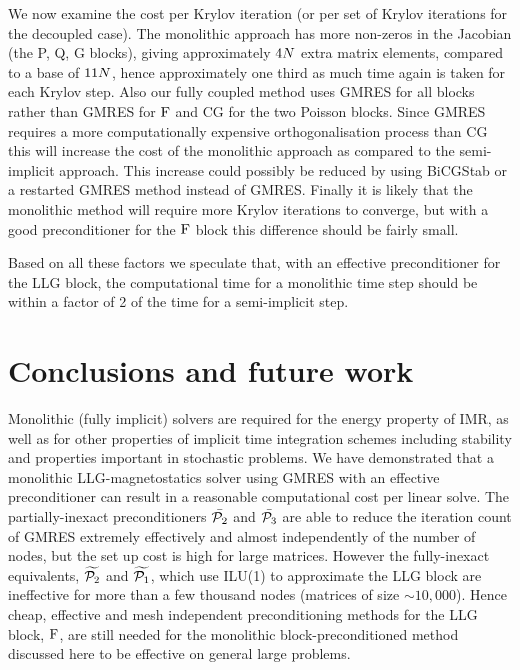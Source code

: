 We now examine the cost per Krylov iteration (or per set of Krylov iterations for the decoupled case).
The monolithic approach has more non-zeros in the Jacobian (the P, Q, G blocks), giving approximately $4 N$ extra matrix elements, compared to a base of $11 N$, hence approximately one third as much time again is taken for each Krylov step.
Also our fully coupled method uses GMRES for all blocks rather than GMRES for $\mathrm{F}$ and CG for the two Poisson blocks.
Since GMRES requires a more computationally expensive orthogonalisation process than CG this will increase the cost of the monolithic approach as compared to the semi-implicit approach.
This increase could possibly be reduced by using BiCGStab or a restarted GMRES method instead of GMRES.
Finally it is likely that the monolithic method will require more Krylov iterations to converge, but with a good preconditioner for the $\mathrm{F}$ block this difference should be fairly small.

Based on all these factors we speculate that, with an effective preconditioner for the LLG block, the computational time for a monolithic time step should be within a factor of 2 of the time for a semi-implicit step.


\section{Conclusions and future work}

Monolithic (fully implicit) solvers are required for the energy property of IMR, as well as for other properties of implicit time integration schemes including stability and properties important in stochastic problems.
We have demonstrated that a monolithic LLG-magnetostatics solver using GMRES with an effective preconditioner can result in a reasonable computational cost per linear solve.
The partially-inexact preconditioners $\bar{\mathcal{P}_2}$ and $\bar{\mathcal{P}_3}$ are able to reduce the iteration count of GMRES extremely effectively and almost independently of the number of nodes, but the set up cost is high for large matrices.
However the fully-inexact equivalents, $\widetilde{\mathcal{P}_2}$ and  $\widetilde{\mathcal{P}_1}$, which use ILU(1) to approximate the LLG block are ineffective for more than a few thousand nodes (\ie matrices of size $\sim 10,000$).
Hence cheap, effective and mesh independent preconditioning methods for the LLG block, $\mathrm{F}$, are still needed for the monolithic block-preconditioned method discussed here to be effective on general large problems.

